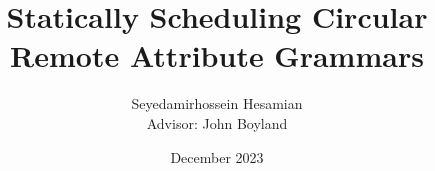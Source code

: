 \newcommand{\theadvisor}{{Dr. Boyland}}
\newcommand{\theuniversity}{{University of Wisconsin-Milwaukee}}
\newcommand{\theyear}{{2021}}

\author[Seyedamirhossein Hesamian]{Seyedamirhossein Hesamian \texorpdfstring{\\{\small Advisor: John Boyland}}{}}

\title{Statically Scheduling Circular Remote Attribute Grammars}
\date{December 2023}
